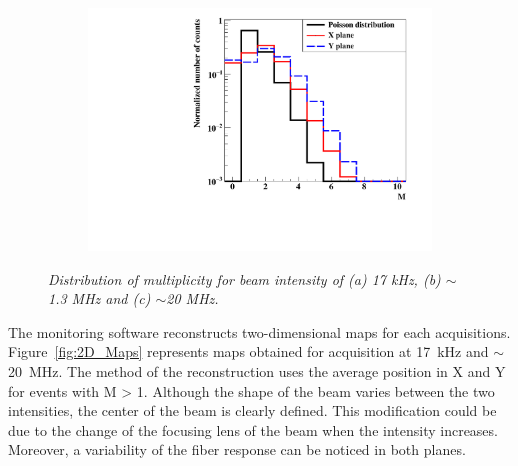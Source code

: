 \documentclass[a4paper,11pt]{article}
\begin{document}
\begin{figure}[htb]
\begin{subfigure}{0.32\textwidth}
    \end{subfigure}
    \begin{subfigure}{0.32\textwidth} \centering \includegraphics[width=\textwidth]{figures/Involved_fibers_20MHz_without_X=0.pdf} \caption{} \label{fig:Fibers_20MHz}
    \end{subfigure}
\caption{\small{\textit{Distribution of multiplicity for beam intensity of (a) 17 kHz, (b) $\sim$1.3 MHz and (c) $\sim$20 MHz.}}}
\label{fig:Multiplicity}
\end{figure}

The monitoring software reconstructs two-dimensional maps for each acquisitions. Figure~\ref{fig:2D_Maps} represents maps obtained for acquisition at 17~kHz and $\sim$20~MHz. The method of the reconstruction uses the  average position in X and Y for events with M > 1. Although the shape of the beam varies between the two intensities, the center of the beam is clearly defined. This modification could be due to the change of the focusing lens of the beam when the intensity increases. Moreover, a variability of the fiber response can be noticed in both planes.
\end{document}
